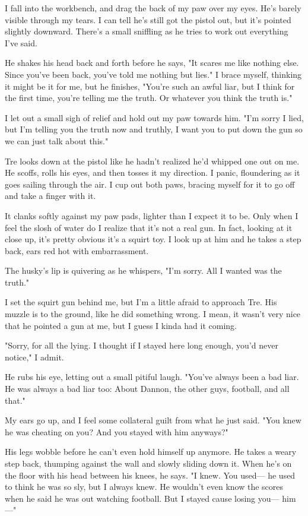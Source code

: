 I fall into the workbench, and drag the back of my paw over my eyes. He's barely visible through my tears. I can tell he's still got the pistol out, but it's pointed slightly downward. There's a small sniffling as he tries to work out everything I've said.

He shakes his head back and forth before he says, "It scares me like nothing else. Since you've been back, you've told me nothing but lies." I brace myself, thinking it might be it for me, but he finishes, "You're such an awful liar, but I think for the first time, you're telling me the truth. Or whatever you think the truth is."

I let out a small sigh of relief and hold out my paw towards him. "I'm sorry I lied, but I'm telling you the truth now and truthly, I want you to put down the gun so we can just talk about this."

Tre looks down at the pistol like he hadn't realized he'd whipped one out on me. He scoffs, rolls his eyes, and then tosses it my direction. I panic, floundering as it goes sailing through the air. I cup out both paws, bracing myself for it to go off and take a finger with it.

It clanks softly against my paw pads, lighter than I expect it to be. Only when I feel the slosh of water do I realize that it's not a real gun. In fact, looking at it close up, it's pretty obvious it's a squirt toy. I look up at him and he takes a step back, ears red hot with embarrassment.

The husky's lip is quivering as he whispers, "I'm sorry. All I wanted was the truth."

I set the squirt gun behind me, but I'm a little afraid to approach Tre. His muzzle is to the ground, like he did something wrong. I mean, it wasn't very nice that he pointed a gun at me, but I guess I kinda had it coming.

"Sorry, for all the lying. I thought if I stayed here long enough, you'd never notice," I admit.

He rubs his eye, letting out a small pitiful laugh. "You've always been a bad liar. He was always a bad liar too: About Dannon, the other guys, football, and all that."

My ears go up, and I feel some collateral guilt from what he just said. "You knew he was cheating on you? And you stayed with him anyways?"

His legs wobble before he can't even hold himself up anymore. He takes a weary step back, thumping against the wall and slowly sliding down it. When he's on the floor with his head between his knees, he says. "I knew. You used--- he used to think he was so sly, but I always knew. He wouldn't even know the scores when he said he was out watching football. But I stayed cause losing you--- him---"

